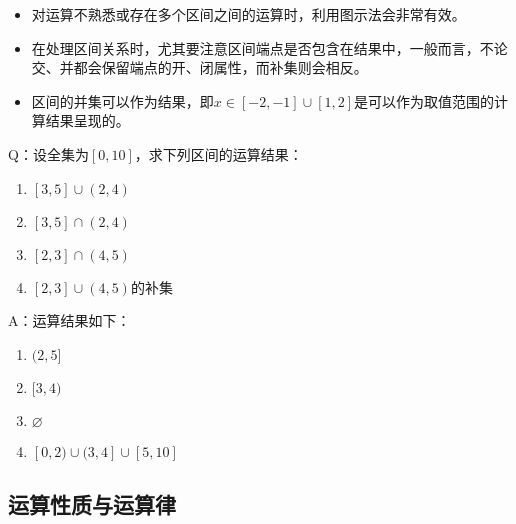\begin{itemize}
\item 对运算不熟悉或存在多个区间之间的运算时，利用图示法会非常有效。
\item 在处理区间关系时，尤其要注意区间端点是否包含在结果中，一般而言，不论交、并都会保留端点的开、闭属性，而补集则会相反。
\item 区间的并集可以作为结果，即$x\in[-2,-1]\cup[1,2]$是可以作为取值范围的计算结果呈现的。
\end{itemize}
\begin{exercise}{}
Q：设全集为$[0,10]$，求下列区间的运算结果：
\begin{enumerate}
\item $[3,5]\cup(2,4)$
\item $[3,5]\cap(2,4)$
\item $[2,3]\cap(4,5)$
\item $[2,3]\cup(4,5)$的补集
\end{enumerate}
A：运算结果如下：
\begin{enumerate}
\item $(2,5]$
\item $[3,4)$
\item $\varnothing$
\item $[0,2)\cup(3,4]\cup[5,10]$
\end{enumerate}
\end{exercise}

\subsection{运算性质与运算律}


